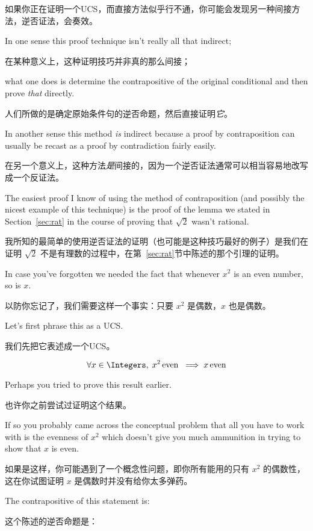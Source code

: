 如果你正在证明一个UCS，而直接方法似乎行不通，你可能会发现另一种间接方法，逆否证法，会奏效。

In one sense this proof technique isn't really all that
indirect;

在某种意义上，这种证明技巧并非真的那么间接；

what one does is determine the contrapositive of the original
conditional and then prove {\em that} directly.

人们所做的是确定原始条件句的逆否命题，然后直接证明{\em 它}。

In another sense this
method {\em is} indirect because a proof by contraposition can usually
be recast as a proof by contradiction fairly easily.

在另一个意义上，这种方法{\em 是}间接的，因为一个逆否证法通常可以相当容易地改写成一个反证法。

The easiest proof I know of using the method of contraposition (and possibly
the nicest example of this technique)
is the proof of the lemma we stated in Section~\ref{sec:rat} in the course
of proving that $\sqrt{2}$ wasn't rational.

我所知的最简单的使用逆否证法的证明（也可能是这种技巧最好的例子）是我们在证明 $\sqrt{2}$ 不是有理数的过程中，在第~\ref{sec:rat}节中陈述的那个引理的证明。

In case you've forgotten
we needed the fact that whenever $x^2$ is an even number, so is $x$.

以防你忘记了，我们需要这样一个事实：只要 $x^2$ 是偶数，$x$ 也是偶数。

Let's first phrase this as a UCS.

我们先把它表述成一个UCS。

\[ \forall x \in \Integers, \; x^2 \, \mbox{even} \; \implies x \, \mbox{even}
\]

Perhaps you tried to prove this result earlier.

也许你之前尝试过证明这个结果。

If so you probably
came across the conceptual problem that all you have to work with
is the evenness of $x^2$ which doesn't give you much ammunition
in trying to show that $x$ is even.

如果是这样，你可能遇到了一个概念性问题，即你所有能用的只有 $x^2$ 的偶数性，这在你试图证明 $x$ 是偶数时并没有给你太多弹药。

The contrapositive of this
statement is:

这个陈述的逆否命题是：

